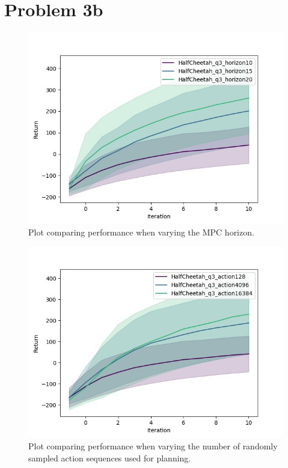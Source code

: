 \documentclass[a4paper]{article}
\begin{document}
\section*{Problem 3b}
\begin{figure}[H]
\centering
\includegraphics[width=1\textwidth]{p3ba.jpg}
\caption{Plot comparing performance when varying the MPC horizon.}
\end{figure}
\begin{figure}[H]
\centering
\includegraphics[width=1\textwidth]{p3bb.jpg}
\caption{Plot comparing performance when varying the number of randomly sampled action sequences used for planning.}
\end{figure}
\end{document}
